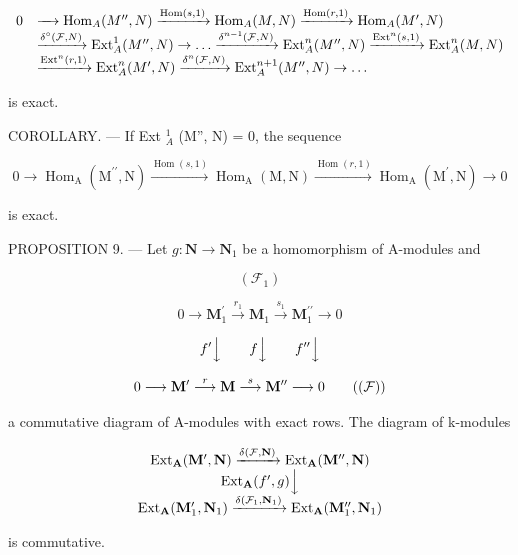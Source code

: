 \[
\begin{array}{r l} 0 & \xrightarrow {\quad} \operatorname{Hom} _ {A} (M ^ {\prime \prime}, N) \xrightarrow {\operatorname{Hom} (s , 1)} \operatorname{Hom} _ {A} (M, N) \xrightarrow {\operatorname{Hom} (r , 1)} \operatorname{Hom} _ {A} (M ^ {\prime}, N) \\ & \xrightarrow {\delta^ {\circ} (\mathcal {F} , N)} \operatorname{Ext} _ {A} ^ {1} (M ^ {\prime \prime}, N) \to \dots \xrightarrow {\delta^ {n - 1} (\mathcal {F} , N)} \operatorname{Ext} _ {A} ^ {n} (M ^ {\prime \prime}, N) \xrightarrow {\operatorname{Ext} ^ {n} (s , 1)} \operatorname{Ext} _ {A} ^ {n} (M, N) \\ & \xrightarrow {\operatorname{Ext} ^ {n} (r , 1)} \operatorname{Ext} _ {A} ^ {n} (M ^ {\prime}, N) \xrightarrow {\delta^ {n} (\mathcal {F} , N)} \operatorname{Ext} _ {A} ^ {n + 1} (M ^ {\prime \prime}, N) \to \dots \end{array}
\]

is exact.

COROLLARY. --- If Ext \(_{A}^{1}\) (M'', N) = 0, the sequence

\[
0 \longrightarrow \operatorname{Hom} _ {\mathrm{A}} \left(\mathrm{M} ^ {\prime \prime}, \mathrm{N}\right) \xrightarrow {\operatorname{Hom} (s , 1)} \operatorname{Hom} _ {\mathrm{A}} (\mathrm{M}, \mathrm{N}) \xrightarrow {\operatorname{Hom} (r , 1)} \operatorname{Hom} _ {\mathrm{A}} \left(\mathrm{M} ^ {\prime}, \mathrm{N}\right) \longrightarrow 0
\]

is exact.

PROPOSITION 9. --- Let \(g: \mathbf{N} \to \mathbf{N}_1\) be a homomorphism of A-modules and

\[
(\mathcal {F} _ {1})
\]

\[
0 \longrightarrow \mathbf {M} _ {1} ^ {\prime} \xrightarrow {r _ {1}} \mathbf {M} _ {1} \xrightarrow {s _ {1}} \mathbf {M} _ {1} ^ {\prime \prime} \longrightarrow 0
\]

\[
f ^ {\prime} \Big \downarrow \qquad f \Big \downarrow \qquad f ^ {\prime \prime} \Big \downarrow
\]

\[
0 \longrightarrow \mathbf {M} ^ {\prime} \stackrel {r} {\longrightarrow} \mathbf {M} \stackrel {s} {\longrightarrow} \mathbf {M} ^ {\prime \prime} \longrightarrow 0\tag{$(\mathcal{F})$}
\]

a commutative diagram of A-modules with exact rows. The diagram of k-modules

\[
\begin{array}{c} \operatorname{Ext} _ {\mathbf {A}} (\mathbf {M} ^ {\prime}, \mathbf {N}) \xrightarrow {\delta (\mathcal {F} , \mathbf {N})} \operatorname{Ext} _ {\mathbf {A}} (\mathbf {M} ^ {\prime \prime}, \mathbf {N}) \\ \operatorname{Ext} _ {\mathbf {A}} (f ^ {\prime}, g) \Big \downarrow \\ \operatorname{Ext} _ {\mathbf {A}} (\mathbf {M} _ {1} ^ {\prime}, \mathbf {N} _ {1}) \xrightarrow {\delta (\mathcal {F} _ {1} , \mathbf {N} _ {1})} \operatorname{Ext} _ {\mathbf {A}} (\mathbf {M} _ {1} ^ {\prime \prime}, \mathbf {N} _ {1}) \end{array}
\]

is commutative.

